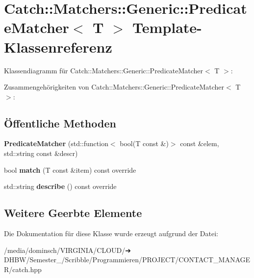 \hypertarget{classCatch_1_1Matchers_1_1Generic_1_1PredicateMatcher}{}\section{Catch\+:\+:Matchers\+:\+:Generic\+:\+:Predicate\+Matcher$<$ T $>$ Template-\/\+Klassenreferenz}
\label{classCatch_1_1Matchers_1_1Generic_1_1PredicateMatcher}


Klassendiagramm für Catch\+:\+:Matchers\+:\+:Generic\+:\+:Predicate\+Matcher$<$ T $>$\+:


Zusammengehörigkeiten von Catch\+:\+:Matchers\+:\+:Generic\+:\+:Predicate\+Matcher$<$ T $>$\+:
\subsection*{Öffentliche Methoden}
\begin{DoxyCompactItemize}
\item 
\mbox{\label{classCatch_1_1Matchers_1_1Generic_1_1PredicateMatcher_a57d53ef028c2f7b92b016f627f91aa76}} 
{\bfseries Predicate\+Matcher} (std\+::function$<$ bool(T const \&)$>$ const \&elem, std\+::string const \&descr)
\item 
\mbox{\label{classCatch_1_1Matchers_1_1Generic_1_1PredicateMatcher_a2ec0e8ec19c4c5e26271d59a06a62b52}} 
bool {\bfseries match} (T const \&item) const override
\item 
\mbox{\label{classCatch_1_1Matchers_1_1Generic_1_1PredicateMatcher_af7d59e94892cc09471bbaefac4c889fd}} 
std\+::string {\bfseries describe} () const override
\end{DoxyCompactItemize}
\subsection*{Weitere Geerbte Elemente}


Die Dokumentation für diese Klasse wurde erzeugt aufgrund der Datei\+:\begin{DoxyCompactItemize}
\item 
/media/dominsch/\+V\+I\+R\+G\+I\+N\+I\+A/\+C\+L\+O\+U\+D/➔ D\+H\+B\+W/\+Semester\+\_/\+Scribble/\+Programmieren/\+P\+R\+O\+J\+E\+C\+T/\+C\+O\+N\+T\+A\+C\+T\+\_\+\+M\+A\+N\+A\+G\+E\+R/catch.\+hpp\end{DoxyCompactItemize}
